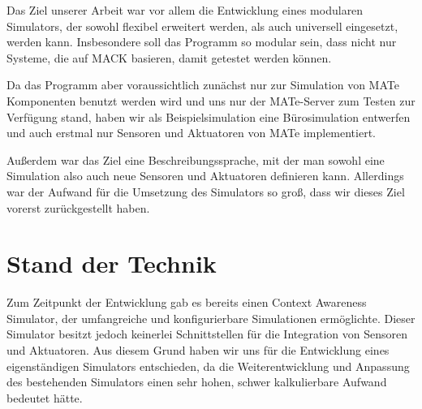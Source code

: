 Das Ziel unserer Arbeit war vor allem die Entwicklung eines modularen Simulators, der sowohl flexibel erweitert werden, als auch universell eingesetzt, werden kann. Insbesondere soll das Programm so modular sein, dass nicht nur Systeme, die auf MACK basieren, damit getestet werden können.

Da das Programm aber voraussichtlich zunächst nur zur Simulation von MATe Komponenten benutzt werden wird und uns nur der MATe-Server zum Testen zur Verfügung stand, haben wir als Beispielsimulation eine Bürosimulation entwerfen und auch erstmal nur Sensoren und Aktuatoren von MATe implementiert. 

Außerdem war das Ziel eine Beschreibungssprache, mit der man sowohl eine Simulation also auch neue Sensoren und Aktuatoren definieren kann. Allerdings war der Aufwand für die Umsetzung des Simulators so groß, dass wir dieses Ziel vorerst zurückgestellt haben.

\section{Stand der Technik}\label{sec:state_of_art}


Zum Zeitpunkt der Entwicklung gab es bereits einen Context Awareness Simulator, der umfangreiche und konfigurierbare Simulationen ermöglichte. Dieser Simulator besitzt jedoch keinerlei Schnittstellen für die Integration von Sensoren und Aktuatoren. Aus diesem Grund haben wir uns für die Entwicklung eines eigenständigen Simulators entschieden, da die Weiterentwicklung und Anpassung des bestehenden Simulators einen sehr hohen, schwer kalkulierbare Aufwand bedeutet hätte.



